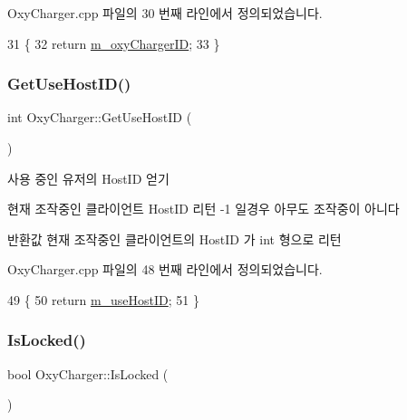Oxy\+Charger.\+cpp 파일의 30 번째 라인에서 정의되었습니다.


\begin{DoxyCode}
31 \{
32     \textcolor{keywordflow}{return} \hyperlink{class_oxy_charger_a7229fb2e4423cad1f648bd710ee8d092}{m\_oxyChargerID};
33 \}
\end{DoxyCode}
\mbox{\label{class_oxy_charger_adcc945553172f5f75af9f64b888d285a}} 
\subsubsection{\texorpdfstring{Get\+Use\+Host\+I\+D()}{GetUseHostID()}}
{\footnotesize\ttfamily int Oxy\+Charger\+::\+Get\+Use\+Host\+ID (\begin{DoxyParamCaption}{ }\end{DoxyParamCaption})}



사용 중인 유저의 Host\+ID 얻기 

현재 조작중인 클라이언트 Host\+ID 리턴  -\/1 일경우 아무도 조작중이 아니다

\begin{DoxyReturn}{반환값}
현재 조작중인 클라이언트의 Host\+ID 가 int 형으로 리턴 
\end{DoxyReturn}


Oxy\+Charger.\+cpp 파일의 48 번째 라인에서 정의되었습니다.


\begin{DoxyCode}
49 \{ 
50     \textcolor{keywordflow}{return} \hyperlink{class_oxy_charger_af10a0504b33a8e3b6ded341cf067b9ad}{m\_useHostID}; 
51 \}
\end{DoxyCode}
\mbox{\label{class_oxy_charger_a7c8d2121a1ac586b2da477bc305c0f7d}} 
\subsubsection{\texorpdfstring{Is\+Locked()}{IsLocked()}}
{\footnotesize\ttfamily bool Oxy\+Charger\+::\+Is\+Locked (\begin{DoxyParamCaption}{ }\end{DoxyParamCaption})}



